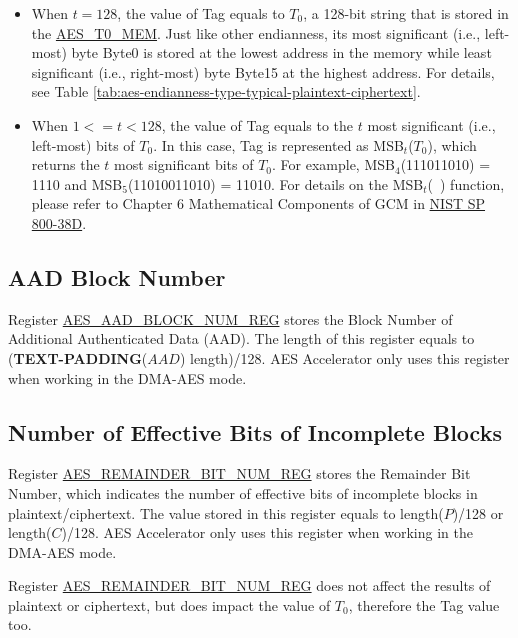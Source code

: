 \documentclass[main\_\_EN.tex]{subfiles}
\begin{document}
\begin{itemize}
    \item When $t = 128$, the value of Tag equals to $T_0$, a 128-bit string that is stored in the \label{memdesc:AEST0MEM}\hyperref[memdesc:AEST0MEM]{AES\_T0\_MEM}. Just like other endianness, its most significant (i.e., left-most) byte Byte0 is stored at the lowest address in the memory while least significant (i.e., right-most) byte Byte15 at the highest address. For details, see Table \ref{tab:aes-endianness-type-typical-plaintext-ciphertext}.

    \item When $1 <= t < 128$, the value of Tag equals to the $t$ most significant (i.e., left-most) bits of $T_0$. In this case, Tag is represented as MSB$_t$($T_0$), which returns the $t$ most significant bits of $T_0$. For example, MSB$_4$(111011010) = 1110 and MSB$_5$(11010011010) = 11010. For details on the MSB$_t$(\ ) function, please refer to Chapter 6 Mathematical Components of GCM in \href{https://nvlpubs.nist.gov/nistpubs/Legacy/SP/nistspecialpublication800-38d.pdf}{NIST SP 800-38D}.
\end{itemize}


\subsection{AAD Block Number}\label{sec:aes-aad-block-number}

Register \hyperref[regdesc:AESAADBLOCKNUMREG]{AES\_AAD\_BLOCK\_NUM\_REG} stores the Block Number of Additional Authenticated Data (AAD). The length of this register equals to ({\bfseries TEXT-PADDING}($AAD$) length)/128. AES Accelerator only uses this register when working in the DMA-AES mode.


\subsection{Number of Effective Bits of Incomplete Blocks}\label{sec:aes-remainder-bit-number}

Register \hyperref[regdesc:AESREMAINDERBITNUMREG]{AES\_REMAINDER\_BIT\_NUM\_REG} stores the Remainder Bit Number, which indicates the number of effective bits of incomplete blocks in plaintext/ciphertext. The value stored in this register equals to length($P$)/128 or length($C$)/128. AES Accelerator only uses this register when working in the DMA-AES mode.

Register \hyperref[regdesc:AESREMAINDERBITNUMREG]{AES\_REMAINDER\_BIT\_NUM\_REG} does not affect the results of plaintext or ciphertext, but does impact the value of $T_{0}$, therefore the Tag value too.
\end{document}

